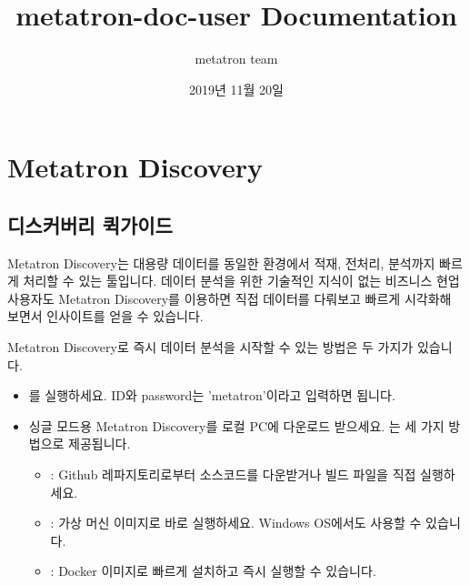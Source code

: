\documentclass[letterpaper,10pt,english]{sphinxmanual}
\title{metatron-doc-user Documentation}
\date{2019년 11월 20일}
\author{metatron team}
\begin{document}
\pagestyle{empty}
\sphinxmaketitle
\pagestyle{plain}
\sphinxtableofcontents
\pagestyle{normal}
\label{\detokenize{index::doc}}



\part{Metatron Discovery}
\label{\detokenize{index:metatron-discovery}}

\chapter{디스커버리 퀵가이드}
\label{\detokenize{discovery/part00/index:id1}}\label{\detokenize{discovery/part00/index::doc}}
Metatron Discovery는 대용량 데이터를 동일한 환경에서 적재, 전처리, 분석까지 빠르게 처리할 수 있는 툴입니다. 데이터 분석을 위한 기술적인 지식이 없는 비즈니스 현업 사용자도 Metatron Discovery를 이용하면 직접 데이터를 다뤄보고 빠르게 시각화해 보면서 인사이트를 얻을 수 있습니다.

Metatron Discovery로 즉시 데이터 분석을 시작할 수 있는 방법은 두 가지가 있습니다.
\begin{itemize}
\item {} 
 를 실행하세요. ID와 password는 'metatron'이라고 입력하면 됩니다.

\item {} 
 싱글 모드용 Metatron Discovery를 로컬 PC에 다운로드 받으세요. 는 세 가지 방법으로 제공됩니다.
\begin{itemize}
\item {} 
: Github 레파지토리로부터 소스코드를 다운받거나 빌드 파일을 직접 실행하세요.

\item {} 
: 가상 머신 이미지로 바로 실행하세요. Windows OS에서도 사용할 수 있습니다.

\item {} 
: Docker 이미지로 빠르게 설치하고 즉시 실행할 수 있습니다.

\end{itemize}

\end{itemize}
\end{document}
